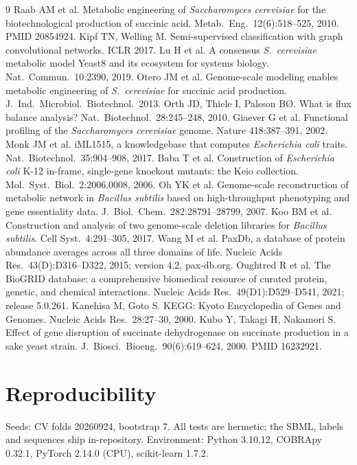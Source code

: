 \documentclass[12pt]{article}
\begin{document}
\begin{thebibliography}{9}
 Raab AM et al. Metabolic engineering of
\emph{Saccharomyces cerevisiae} for the biotechnological production of
succinic acid. Metab.\ Eng.\ 12(6):518--525, 2010. PMID 20854924.
 Kipf TN, Welling M. Semi-supervised classification with
graph convolutional networks. ICLR 2017.
 Lu H et al. A consensus \emph{S.\ cerevisiae} metabolic
model Yeast8 and its ecosystem for systems biology. Nat.\ Commun.\
10:2390, 2019.
 Otero JM et al. Genome-scale modeling enables
metabolic engineering of \emph{S.\ cerevisiae} for succinic acid
production. J.\ Ind.\ Microbiol.\ Biotechnol.\ 2013.
 Orth JD, Thiele I, Palsson B{\O}. What is flux balance
analysis? Nat.\ Biotechnol.\ 28:245--248, 2010.
 Giaever G et al. Functional profiling of the
\emph{Saccharomyces cerevisiae} genome. Nature 418:387--391, 2002.
\bibitem{monk2017} Monk JM et al. iML1515, a knowledgebase that computes
\emph{Escherichia coli} traits. Nat.\ Biotechnol.\ 35:904--908, 2017.
\bibitem{baba2006} Baba T et al. Construction of \emph{Escherichia coli}
K-12 in-frame, single-gene knockout mutants: the Keio collection.
Mol.\ Syst.\ Biol.\ 2:2006.0008, 2006.
 Oh YK et al. Genome-scale reconstruction of metabolic
network in \emph{Bacillus subtilis} based on high-throughput phenotyping
and gene essentiality data. J.\ Biol.\ Chem.\ 282:28791--28799, 2007.
\bibitem{koo2017} Koo BM et al. Construction and analysis of two
genome-scale deletion libraries for \emph{Bacillus subtilis}.
Cell Syst.\ 4:291--305, 2017.
 Wang M et al. PaxDb, a database of protein abundance
averages across all three domains of life. Nucleic Acids Res.\
43(D):D316--D322, 2015; version 4.2, pax-db.org.
\bibitem{biogrid} Oughtred R et al. The BioGRID database: a comprehensive
biomedical resource of curated protein, genetic, and chemical
interactions. Nucleic Acids Res.\ 49(D1):D529--D541, 2021; release 5.0.261.
\bibitem{kegg} Kanehisa M, Goto S. KEGG: Kyoto Encyclopedia of Genes
and Genomes. Nucleic Acids Res.\ 28:27--30, 2000.
\bibitem{kubo2000} Kubo Y, Takagi H, Nakamori S. Effect of gene
disruption of succinate dehydrogenase on succinate production in a sake
yeast strain. J.\ Biosci.\ Bioeng.\ 90(6):619--624, 2000. PMID 16232921.
\end{thebibliography}

\appendix
\section{Reproducibility}
Seeds: CV folds 20260924, bootstrap 7. All tests are hermetic; the SBML,
labels and sequences ship in-repository. Environment: Python 3.10.12,
COBRApy 0.32.1, PyTorch 2.14.0 (CPU), scikit-learn 1.7.2.
\end{document}
